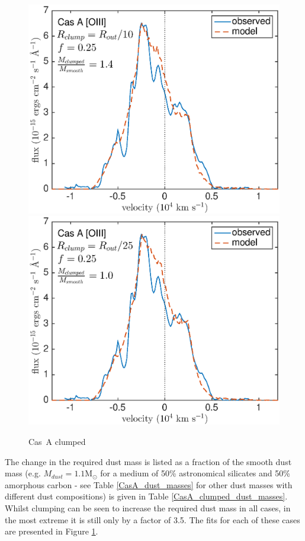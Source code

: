 \begin{figure}
\vspace{6mm}
\includegraphics[scale=0.43,clip=true, trim=30 0 50 20]{chapters/chapter6/figs/CasA/clumped/CasA_OIII_c10_f0_25}
\includegraphics[scale=0.43,clip=true, trim=30 0 40 20]{chapters/chapter6/figs/CasA/clumped/CasA_OIII_c25_f0_25}

\caption{Cas~A clumped}
\label{CasA_OIII_clumped}
\end{figure}

The change in the required dust mass is listed as a fraction of the smooth dust mass (e.g. $M_{dust}=1.1$M$_{\odot}$ for a medium of 50\% astronomical silicates and 50\% amorphous carbon - see Table \ref{CasA_dust_masses} for other dust masses with different dust compositions) is given in Table \ref{CasA_clumped_dust_masses}.  Whilst clumping can be seen to increase the required dust mass in all cases, in the most extreme it is still only by a factor of 3.5.  The fits for each of these cases are presented in Figure \ref{CasA_OIII_clumped}.


